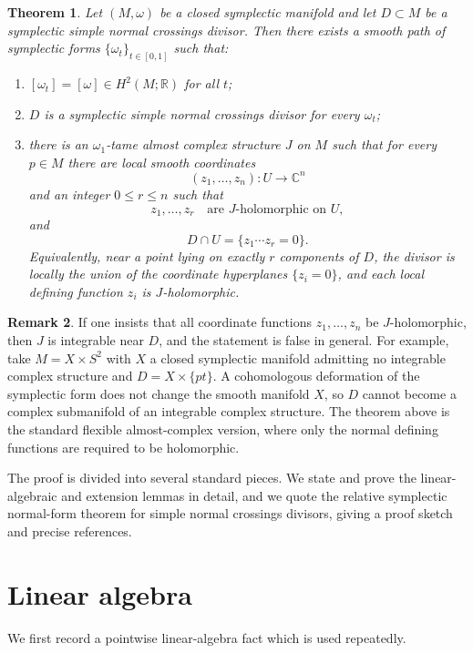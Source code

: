\documentclass[11pt]{article}
\newtheorem{theorem}{Theorem}
\theoremstyle{definition}
\newtheorem{remark}[theorem]{Remark}
\numberwithin{equation}{section}
\begin{document}
\begin{theorem}\label{thm:main}
Let $(M,\omega)$ be a closed symplectic manifold and let $D\subset M$ be a symplectic simple normal crossings divisor.  Then there exists a smooth path of symplectic forms $\{\omega_t\}_{t\in[0,1]}$ such that:
\begin{enumerate}[label=(\roman*)]
\item $[\omega_t]=[\omega]\in H^2(M;\mathbb R)$ for all $t$;
\item $D$ is a symplectic simple normal crossings divisor for every $\omega_t$;
\item there is an $\omega_1$-tame almost complex structure $J$ on $M$ such that for every $p\in M$ there are local smooth coordinates
\[
(z_1,\dots,z_n):U\longrightarrow \mathbb C^n
\]
and an integer $0\le r\le n$ such that
\[
z_1,\dots,z_r\quad\text{are $J$-holomorphic on $U$},
\]
and
\[
D\cap U=\{z_1\cdots z_r=0\}.
\]
Equivalently, near a point lying on exactly $r$ components of $D$, the divisor is locally the union of the coordinate hyperplanes $\{z_i=0\}$, and each local defining function $z_i$ is $J$-holomorphic.
\end{enumerate}
\end{theorem}

\begin{remark}
If one insists that all coordinate functions $z_1,\dots,z_n$ be $J$-holomorphic, then $J$ is integrable near $D$, and the statement is false in general.  For example, take $M=X\times S^2$ with $X$ a closed symplectic manifold admitting no integrable complex structure and $D=X\times\{pt\}$.  A cohomologous deformation of the symplectic form does not change the smooth manifold $X$, so $D$ cannot become a complex submanifold of an integrable complex structure.  The theorem above is the standard flexible almost-complex version, where only the normal defining functions are required to be holomorphic.
\end{remark}

The proof is divided into several standard pieces.  We state and prove the linear-algebraic and extension lemmas in detail, and we quote the relative symplectic normal-form theorem for simple normal crossings divisors, giving a proof sketch and precise references.

\section{Linear algebra}

We first record a pointwise linear-algebra fact which is used repeatedly.
\end{document}
